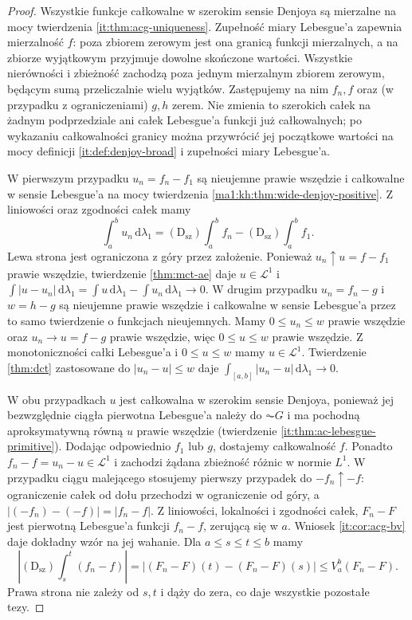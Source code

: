 \begin{proof}
Wszystkie funkcje całkowalne w szerokim sensie Denjoya
są mierzalne na mocy twierdzenia \ref{it:thm:acg-uniqueness}.
Zupełność miary Lebesgue'a zapewnia mierzalność $f$:
poza zbiorem zerowym jest ona granicą funkcji mierzalnych,
a na zbiorze wyjątkowym przyjmuje dowolne skończone wartości.
Wszystkie nierówności i zbieżność zachodzą poza jednym
mierzalnym zbiorem zerowym, będącym sumą przeliczalnie wielu wyjątków. Zastępujemy na nim $f_n,f$ oraz (w przypadku z ograniczeniami) $g,h$ zerem. Nie zmienia to szerokich całek na żadnym podprzedziale ani całek Lebesgue'a funkcji już całkowalnych; po wykazaniu całkowalności granicy można przywrócić jej początkowe wartości na mocy definicji \ref{it:def:denjoy-broad} i zupełności miary Lebesgue'a.

W pierwszym przypadku $u_n=f_n-f_1$ są nieujemne
prawie wszędzie i całkowalne w sensie Lebesgue'a na mocy
twierdzenia \ref{ma1:kh:thm:wide-denjoy-positive}.
Z liniowości oraz zgodności całek mamy
\[
 \int_a^b u_n\,\mathrm d\lambda_1
 =(\mathrm D_{\mathrm{sz}})\int_a^b f_n
 -(\mathrm D_{\mathrm{sz}})\int_a^b f_1.
\]
Lewa strona jest ograniczona z góry przez założenie.
Ponieważ $u_n\uparrow u=f-f_1$ prawie wszędzie, twierdzenie
\ref{thm:mct-ae} daje $u\in\mathcal L^1$ i
$\int |u-u_n|\,\mathrm d\lambda_1
=\int u\,\mathrm d\lambda_1-\int u_n\,\mathrm d\lambda_1\to0$.
W drugim przypadku $u_n=f_n-g$ i $w=h-g$ są nieujemne
prawie wszędzie i całkowalne w sensie Lebesgue'a przez to
samo twierdzenie o funkcjach nieujemnych. Mamy
$0\le u_n\le w$ prawie wszędzie oraz $u_n\to u=f-g$
prawie wszędzie, więc $0\le u\le w$ prawie wszędzie.
Z monotoniczności całki Lebesgue'a i $0\le u\le w$ mamy $u\in\mathcal L^1$. Twierdzenie \ref{thm:dct} zastosowane do $|u_n-u|\le w$ daje $\int_{[a,b]}|u_n-u|\,\mathrm d\lambda_1\to0$.

W obu przypadkach $u$ jest całkowalna w szerokim sensie
Denjoya, ponieważ jej bezwzględnie ciągła pierwotna
Lebesgue'a należy do $\AC G$ i ma pochodną aproksymatywną
równą $u$ prawie wszędzie (twierdzenie
\ref{it:thm:ac-lebesgue-primitive}). Dodając odpowiednio
$f_1$ lub $g$, dostajemy całkowalność $f$.
Ponadto $f_n-f=u_n-u\in\mathcal L^1$ i zachodzi
żądana zbieżność różnic w normie $L^1$. W przypadku ciągu malejącego stosujemy pierwszy przypadek do $-f_n\uparrow-f$: ograniczenie całek od dołu przechodzi w ograniczenie od góry, a $|(-f_n)-(-f)|=|f_n-f|$.
Z liniowości, lokalności i zgodności całek,
$F_n-F$ jest pierwotną Lebesgue'a funkcji $f_n-f$,
zerującą się w $a$. Wniosek \ref{it:cor:acg-bv}
daje dokładny wzór na jej wahanie.
Dla $a\le s\le t\le b$ mamy
\[
 \left|(\mathrm D_{\mathrm{sz}})\int_s^t(f_n-f)\right|
 =\left|(F_n-F)(t)-(F_n-F)(s)\right|
 \le V_a^b(F_n-F).
\]
Prawa strona nie zależy od $s,t$ i dąży do zera,
co daje wszystkie pozostałe tezy.
\end{proof}
